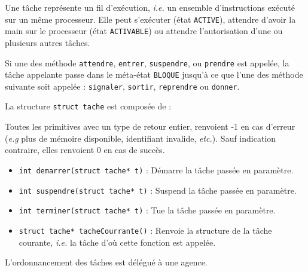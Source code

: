 {
Une tâche représente un fil d'exécution, \textsl{i.e.} un ensemble d'instructions exécuté sur un même processeur. Elle peut s'exécuter (état \lstinline{ACTIVE}), attendre d'avoir la main sur le processeur (état \lstinline{ACTIVABLE}) ou attendre l'autorisation d'une ou plusieurs autres tâches. 

Si une des méthode \lstinline{attendre}, \lstinline{entrer}, \lstinline{suspendre}, ou \lstinline{prendre} est appelée, la tâche appelante passe dans le méta-état \lstinline{BLOQUE} jusqu'à ce que l'une des méthode suivante soit appelée : \lstinline{signaler}, \lstinline{sortir}, \lstinline{reprendre} ou \lstinline{donner}.
}
{
La structure \lstinline{struct tache} est composée de :
}
{
Toutes les primitives avec un type de retour entier, renvoient -1 en cas d'erreur (\textsl{e.g} plus de mémoire disponible, identifiant invalide, \textsl{etc.}). Sauf indication contraire, elles renvoient 0 en cas de succès.

\begin{itemize}
	\item \lstinline{int demarrer(struct tache* t)} : Démarre la tâche passée en paramètre.
	\item \lstinline{int suspendre(struct tache* t)} : Suspend la tâche passée en paramètre. 
	\item \lstinline{int terminer(struct tache* t)} : Tue la tâche passée en paramètre.
	\item \lstinline{struct tache* tacheCourrante()} : Renvoie la structure de la tâche courante, \textsl{i.e.} la tâche d'où cette fonction est appelée.
\end{itemize}
}
{
\begin{figure} [htp]
\centering
\end{figure}
}
{L'ordonnancement des tâches est délégué à une agence.}
